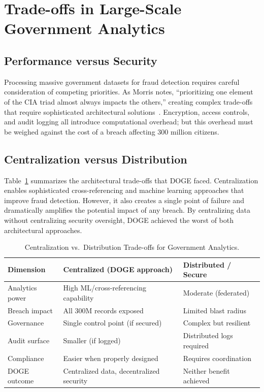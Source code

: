 \documentclass[sigconf,nonacm]{acmart}
\begin{document}
\section{Trade-offs in Large-Scale Government Analytics}

\subsection{Performance versus Security}

Processing massive government datasets for fraud detection requires careful consideration
of competing priorities. As Morris notes, ``prioritizing one element of the CIA triad
almost always impacts the others,'' creating complex trade-offs that require
sophisticated architectural solutions~\cite{morris2023}. Encryption, access controls,
and audit logging all introduce computational overhead; but this overhead must be
weighed against the cost of a breach affecting 300 million citizens.

\subsection{Centralization versus Distribution}

Table~\ref{tab:tradeoffs} summarizes the architectural trade-offs that DOGE faced.
Centralization enables sophisticated cross-referencing and machine learning approaches
that improve fraud detection. However, it also creates a single point of failure and
dramatically amplifies the potential impact of any breach. By centralizing data without
centralizing security oversight, DOGE achieved the worst of both architectural
approaches.

\begin{table}[h]
\caption{Centralization vs.\ Distribution Trade-offs for Government Analytics.}
\label{tab:tradeoffs}
\small
\begin{tabularx}{\columnwidth}{@{}p{2.1cm}X X@{}}
\toprule
\textbf{Dimension} & \textbf{Centralized (DOGE approach)} & \textbf{Distributed / Secure} \\
\midrule
Analytics power & High ML/cross-referencing capability & Moderate (federated) \\
Breach impact   & All 300M records exposed             & Limited blast radius \\
Governance      & Single control point (if secured)    & Complex but resilient \\
Audit surface   & Smaller (if logged)                  & Distributed logs required \\
Compliance      & Easier when properly designed        & Requires coordination \\
DOGE outcome    & Centralized data, decentralized security & Neither benefit achieved \\
\bottomrule
\end{tabularx}
\end{table}
\end{document}

